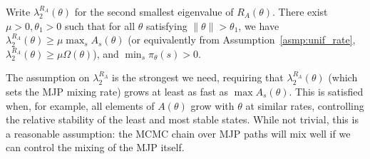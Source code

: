 \begin{assumption}
  Write $\lambda^{R_A}_2(\theta)$ for the second smallest eigenvalue of
    $R_A(\theta)$. There exist $\mu > 0, \theta_1 > 0$
    such that for all $\theta$ satisfying $ \| \theta \|> \theta_1$, 
    we have $ \lambda^{R_A}_2(\theta) \geq \mu \max_s A_s(\theta)$
    (or equivalently from Assumption~\ref{asmp:unif_rate}, 
    $ \lambda^{R_A}_2(\theta) \geq \mu \Omega(\theta)$),
    and $\min_s \pi_\theta(s) > 0$. 
  \label{asmp:cond_num}
\end{assumption} 
\noindent %
The assumption on $\lambda^{R_A}_2$ is the strongest we need, requiring that 
$\lambda^{R_A}_2(\theta)$ (which sets the MJP mixing rate) grows 
at least as fast as $\max A_s(\theta)$. 
This is satisfied when, for example, all elements of $A(\theta)$ grow 
with $\theta$ at similar rates, controlling the relative stability of 
the least and most stable states.
While not trivial, this is a reasonable assumption: the MCMC chain over MJP paths 
will mix well if we can control the mixing of the MJP itself.
